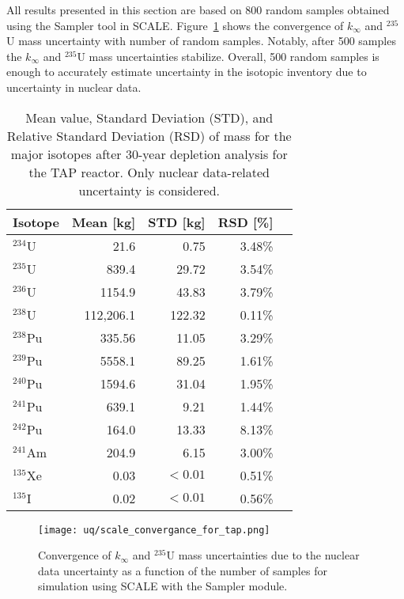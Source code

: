All results presented in this section are based on 800 random samples obtained 
using the Sampler tool in SCALE. Figure~\ref{fig:uq-scale-convergence} 
shows the convergence of $k_{\infty}$ and $^{235}$U mass uncertainty with 
number of random samples. Notably, after 500 samples the $k_{\infty}$ and 
$^{235}$U mass uncertainties stabilize. Overall, 500 random samples is 
enough to accurately estimate uncertainty in the isotopic inventory due to 
uncertainty in nuclear data. 

\begin{table}[hbp!]
	\centering
	\caption{Mean value, Standard Deviation (STD), and Relative Standard 
		Deviation (RSD) of mass for the major isotopes after 30-year depletion 
		analysis for the \gls{TAP} reactor. Only nuclear data-related 
		uncertainty is considered.}
	\begin{tabularx}{0.7\textwidth}{L R R R R}
		\hline
		\textbf{Isotope}  & \textbf{Mean [kg]} & \textbf{STD [kg]} & 
		\textbf{RSD [\%]}\\ \hline
		$^{234}$U  & 21.6  & 0.75  & 3.48\% \\
		$^{235}$U  & 839.4 & 29.72 & 3.54\% \\
		$^{236}$U  & 1154.9& 43.83 & 3.79\% \\
		$^{238}$U  & 112,206.1 & 122.32 & 0.11\% \\
		$^{238}$Pu & 335.56& 11.05 & 3.29\% \\
		$^{239}$Pu & 5558.1& 89.25 & 1.61\% \\
		$^{240}$Pu & 1594.6& 31.04 & 1.95\% \\
		$^{241}$Pu & 639.1 & 9.21  & 1.44\% \\
		$^{242}$Pu & 164.0 & 13.33 & 8.13\% \\
		$^{241}$Am & 204.9 & 6.15  & 3.00\% \\
		$^{135}$Xe & 0.03  &$<0.01$& 0.51\% \\
		$^{135}$I  & 0.02  &$<0.01$& 0.56\% \\ \hline
	\end{tabularx}
	\label{tab:uq-scale-mean-std-rsd}
	\vspace{-0.9em}
\end{table}


\begin{figure}[hbp!] %
	\centering
	\texttt{[image: uq/scale\_convergance\_for\_tap.png]}
	\caption{Convergence of $k_{\infty}$ and $^{235}$U mass uncertainties due 
	to the nuclear data uncertainty as a function of the number of samples for 
	simulation using SCALE with the Sampler module.}
	\label{fig:uq-scale-convergence}
\end{figure}

